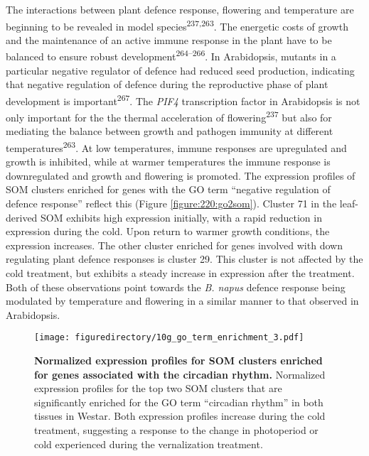 \documentclass[12pt,]{book}
\begin{document}
The interactions between plant defence response, flowering and
temperature are beginning to be revealed in model
species\textsuperscript{237,263}. The energetic costs of growth and the
maintenance of an active immune response in the plant have to be
balanced to ensure robust development\textsuperscript{264--266}. In
Arabidopsis, mutants in a particular negative regulator of defence had
reduced seed production, indicating that negative regulation of defence
during the reproductive phase of plant development is
important\textsuperscript{267}. The \emph{PIF4} transcription factor in
Arabidopsis is not only important for the the thermal acceleration of
flowering\textsuperscript{237} but also for mediating the balance
between growth and pathogen immunity at different
temperatures\textsuperscript{263}. At low temperatures, immune responses
are upregulated and growth is inhibited, while at warmer temperatures
the immune response is downregulated and growth and flowering is
promoted. The expression profiles of SOM clusters enriched for genes
with the GO term ``negative regulation of defence response'' reflect
this (Figure \ref{figure:220:go2som}). Cluster 71 in the leaf-derived
SOM exhibits high expression initially, with a rapid reduction in
expression during the cold. Upon return to warmer growth conditions, the
expression increases. The other cluster enriched for genes involved with
down regulating plant defence responses is cluster 29. This cluster is
not affected by the cold treatment, but exhibits a steady increase in
expression after the treatment. Both of these observations point towards
the \emph{B. napus} defence response being modulated by temperature and
flowering in a similar manner to that observed in Arabidopsis.

\begin{figure}[htbp]
\centering
\texttt{[image: figuredirectory/10g\_go\_term\_enrichment\_3.pdf]}
\caption{\textbf{Normalized expression profiles for SOM clusters
enriched for genes associated with the circadian rhythm.} Normalized
expression profiles for the top two SOM clusters that are significantly
enriched for the GO term ``circadian rhythm'' in both tissues in Westar.
Both expression profiles increase during the cold treatment, suggesting
a response to the change in photoperiod or cold experienced during the
vernalization treatment.}\label{figure:221:go3som}
\end{figure}
\end{document}

